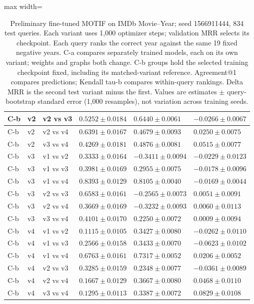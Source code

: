 \begin{table}[htbp]
\begin{adjustbox}{max width=\linewidth}
\begin{tabular}{|l|l|l|l|l|l|}
\hline
C-b & v2 & v2 vs v3 & $0.5252 \pm 0.0184$ & $0.6440 \pm 0.0061$ & $-0.0266 \pm 0.0067$ \\
\hline
C-b & v2 & v2 vs v4 & $0.6391 \pm 0.0167$ & $0.4679 \pm 0.0093$ & $0.0250 \pm 0.0075$ \\
\hline
C-b & v2 & v3 vs v4 & $0.4269 \pm 0.0181$ & $0.4876 \pm 0.0081$ & $0.0515 \pm 0.0077$ \\
\hline
C-b & v3 & v1 vs v2 & $0.3333 \pm 0.0164$ & $-0.3411 \pm 0.0094$ & $-0.0229 \pm 0.0123$ \\
\hline
C-b & v3 & v1 vs v3 & $0.3981 \pm 0.0169$ & $0.2955 \pm 0.0075$ & $-0.0178 \pm 0.0096$ \\
\hline
C-b & v3 & v1 vs v4 & $0.8393 \pm 0.0129$ & $0.8105 \pm 0.0040$ & $-0.0169 \pm 0.0044$ \\
\hline
C-b & v3 & v2 vs v3 & $0.6583 \pm 0.0161$ & $-0.2565 \pm 0.0073$ & $0.0051 \pm 0.0091$ \\
\hline
C-b & v3 & v2 vs v4 & $0.3669 \pm 0.0169$ & $-0.3232 \pm 0.0093$ & $0.0060 \pm 0.0113$ \\
\hline
C-b & v3 & v3 vs v4 & $0.4101 \pm 0.0170$ & $0.2250 \pm 0.0072$ & $0.0009 \pm 0.0094$ \\
\hline
C-b & v4 & v1 vs v2 & $0.1115 \pm 0.0105$ & $0.3427 \pm 0.0080$ & $-0.0262 \pm 0.0110$ \\
\hline
C-b & v4 & v1 vs v3 & $0.2566 \pm 0.0158$ & $0.3433 \pm 0.0070$ & $-0.0623 \pm 0.0102$ \\
\hline
C-b & v4 & v1 vs v4 & $0.6763 \pm 0.0161$ & $0.7317 \pm 0.0052$ & $0.0206 \pm 0.0052$ \\
\hline
C-b & v4 & v2 vs v3 & $0.3285 \pm 0.0159$ & $0.2348 \pm 0.0077$ & $-0.0361 \pm 0.0089$ \\
\hline
C-b & v4 & v2 vs v4 & $0.1667 \pm 0.0129$ & $0.3667 \pm 0.0080$ & $0.0468 \pm 0.0110$ \\
\hline
C-b & v4 & v3 vs v4 & $0.1295 \pm 0.0113$ & $0.3387 \pm 0.0072$ & $0.0829 \pm 0.0108$ \\
\hline
\end{tabular}
\end{adjustbox}
\caption{Preliminary fine-tuned MOTIF on IMDb Movie--Year; seed 1566911444, 834 test queries. Each variant uses 1,000 optimizer steps; validation MRR selects its checkpoint. Each query ranks the correct year against the same 19 fixed negative years. C-a compares separately trained models, each on its own variant; weights and graphs both change. C-b groups hold the selected training checkpoint fixed, including its matched-variant reference. Agreement@1 compares predictions; Kendall tau-b compares within-query rankings. Delta MRR is the second test variant minus the first. Values are estimates $\pm$ query-bootstrap standard error (1,000 resamples), not variation across training seeds.}
\label{tab:motif-imdb-movie-year-matrix-invariance}
\end{table}
